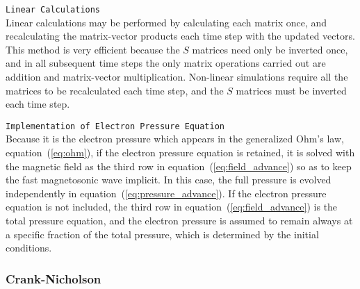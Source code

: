 \texttt{Linear Calculations}
\\
Linear calculations may be performed by calculating each matrix once,
and recalculating the matrix-vector products each time step with the
updated vectors.  This method is very efficient because the $S$
matrices need only be inverted once, and in all subsequent time steps
the only matrix operations carried out are addition and matrix-vector
multiplication.  Non-linear simulations require all the matrices to be
recalculated each time step, and the $S$ matrices must be inverted
each time step.

\texttt{Implementation of Electron Pressure Equation}
\\
Because it is the electron pressure which appears in the generalized
Ohm's law, equation~(\ref{eq:ohm}), if the electron pressure equation
is retained, it is solved with the magnetic field as the third row in
equation~(\ref{eq:field_advance}) so as to keep the fast magnetosonic
wave implicit.  In this case, the full pressure is evolved
independently in equation~(\ref{eq:pressure_advance}).  If the
electron pressure equation is not included, the third row in
equation~(\ref{eq:field_advance}) is the total pressure equation, and
the electron pressure is assumed to remain always at a specific
fraction of the total pressure, which is determined by the initial
conditions.


\subsubsection{Crank-Nicholson}

